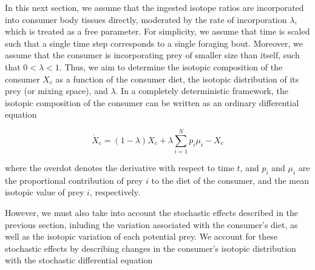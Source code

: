 \documentclass{frontiersSCNS}
\begin{document}
In this next section, we assume that the ingested isotope ratios are incorporated into consumer body tissues directly, moderated by the rate of incorporation $\lambda$, which is treated as a free parameter.
For simplicity, we assume that time is scaled such that a single time step corresponds to a single foraging bout.
Moreover, we assume that the consumer is incorporating prey of smaller size than itself, such that $ 0 < \lambda < 1$.
Thus, we aim to determine the isotopic composition of the consumer $X_c$ as a function of the consumer diet, the isotopic distribution of its prey (or mixing space), and $\lambda$.
In a completely deterministic framework, the isotopic composition of the consumer can be written as an ordinary differential equation

\begin{equation}
\label{eqODE}
\dot X_c = (1-\lambda)X_c + \lambda \sum_{i=1}^N p_i \mu_i - X_c
\end{equation}

\noindent where the overdot denotes the derivative with respect to time $t$, and $p_i$ and $\mu_i$ are the proportional contribution of prey $i$ to the diet of the consumer, and the mean isotopic value of prey $i$, respectively.

However, we must also take into account the stochastic effects described in the previous section, inluding the variation associated with the consumer's diet, as well as the isotopic variation of each potential prey.
We account for these stochastic effects by describing changes in the consumer's isotopic distribution with the stochastic differential equation
\end{document}
